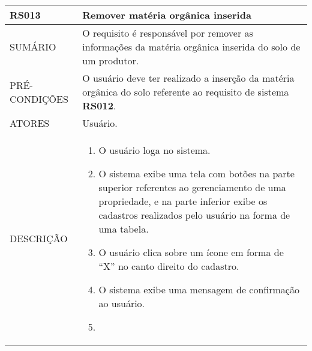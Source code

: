 \begin{longtable}[c]{@{}|p{4cm}|p{9cm}|@{}}
\hline
\begin{minipage}[t]{0.47\columnwidth}
\textbf{RS013}
\end{minipage} & \begin{minipage}[t]{0.47\columnwidth}
Remover matéria orgânica inserida
\end{minipage}
\\\hline
\begin{minipage}[t]{0.47\columnwidth}
SUMÁRIO
\end{minipage} & \begin{minipage}[t]{0.47\columnwidth}
O requisito é responsável por remover as informações da matéria orgânica
inserida do solo de um produtor.
\end{minipage}
\\\hline
\begin{minipage}[t]{0.47\columnwidth}
PRÉ-CONDIÇÕES
\end{minipage} & \begin{minipage}[t]{0.47\columnwidth}
O usuário deve ter realizado a inserção da matéria orgânica do solo
referente ao requisito de sistema \textbf{RS012}.
\end{minipage}
\\\hline
\begin{minipage}[t]{0.47\columnwidth}
ATORES
\end{minipage} & \begin{minipage}[t]{0.47\columnwidth}
Usuário.
\end{minipage}
\\\hline
\begin{minipage}[t]{0.47\columnwidth}
DESCRIÇÃO
\end{minipage} & \begin{minipage}[t]{0.47\columnwidth}
\begin{enumerate}
\def\labelenumi{\arabic{enumi}.}
\itemsep1pt\parskip0pt\parsep0pt
\item
  O usuário loga no sistema.
\item
  O sistema exibe uma tela com botões na parte superior referentes ao
  gerenciamento de uma propriedade, e na parte inferior exibe os
  cadastros realizados pelo usuário na forma de uma tabela.
\item
  O usuário clica sobre um ícone em forma de ``X'' no canto direito do
  cadastro.
\item
  O sistema exibe uma mensagem de confirmação ao usuário.
\item

\end{enumerate}
\end{minipage}
\end{longtable}
